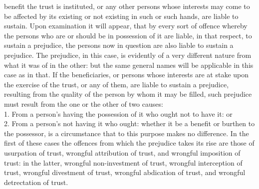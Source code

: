\documentclass[12pt]{report}
\begin{document}
benefit the trust is instituted, or any other persons whose interests
may come to be affected by its existing or not existing in such or such
hands, are liable to sustain. Upon examination it will appear, that by
every sort of offence whereby the persons who are or should be in
possession of it are liable, in that respect, to sustain a prejudice,
the persons now in question are also liable to sustain a prejudice. The
prejudice, in this case, is evidently of a very different nature from
what it was of in the other: but the same general names will be
applicable in this case as in that. If the beneficiaries, or persons
whose interests are at stake upon the exercise of the trust, or any of
them, are liable to sustain a prejudice, resulting from the quality of
the person by whom it may be filled, such prejudice must result from the
one or the other of two causes:\\
1. From a person's having the possession of it who ought not to have it:
or\\
2. From a person's not having it who ought: whether it be a benefit or
burthen to the possessor, is a circumstance that to this purpose makes
no difference. In the first of these cases the offences from which the
prejudice takes its rise are those of usurpation of trust, wrongful
attribution of trust, and wrongful imposition of trust: in the latter,
wrongful non-investment of trust, wrongful interception of trust,
wrongful divestment of trust, wrongful abdication of trust, and wrongful
detrectation of trust.
\end{document}
